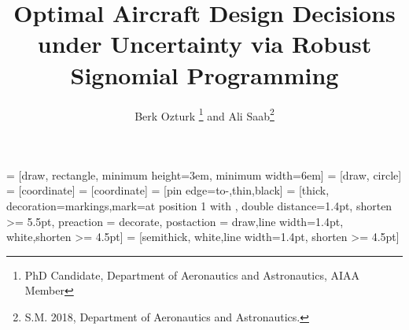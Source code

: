 \title{Optimal Aircraft Design Decisions under Uncertainty via Robust Signomial Programming}

\author{Berk Ozturk \footnote{PhD Candidate, Department of Aeronautics and Astronautics, AIAA Member}
and Ali Saab\footnote{S.M. 2018, Department of Aeronautics and Astronautics.}}


\newcommand{\eqnref}[1]{(\ref{#1})}
\newcommand{\class}[1]{\texttt{#1}}
\newcommand{\package}[1]{\texttt{#1}}
\newcommand{\file}[1]{\texttt{#1}}
\newcommand{\BibTeX}{\textsc{Bib}\TeX}

\renewcommand{\vec}{\mathbf}
\newcommand{\mat}{\mathbf}

\usepackage[utf8]{inputenc}
\usepackage{bbm}
\usepackage{booktabs}
\usepackage{amsmath}
\usepackage{csvsimple}
\usepackage{filecontents}
\usepackage[acronyms]{glossaries}
\usepackage[sort&compress, numbers]{natbib}
\usepackage{tabularx}
\usepackage[toc,page]{appendix}
\usepackage{tikz}
\usepackage{tkz-kiviat}
\usetikzlibrary{shapes, arrows, positioning, decorations.markings, fit}
\usepackage{pgfplotstable}
\usepackage{subcaption}
\usepackage{graphicx}
\makeglossaries

 = [draw, rectangle,
minimum height=3em, minimum width=6em]
 = [draw, circle]
 = [coordinate]
 = [coordinate]
 = [pin edge={to-,thin,black}]
 = [thick, decoration={markings,mark=at position
1 with {}},
double distance=1.4pt, shorten >= 5.5pt,
preaction = {decorate},
postaction = {draw,line width=1.4pt, white,shorten >= 4.5pt}]
 = [semithick, white,line width=1.4pt, shorten >= 4.5pt]

